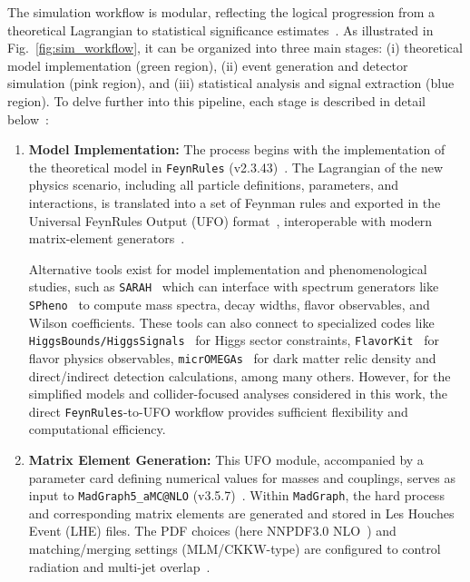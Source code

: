 The simulation workflow is modular, reflecting the logical progression from a theoretical Lagrangian to statistical significance estimates~\cite{Christensen:2008py,Alloul:2013bka,Degrande:2011ua,Alwall:2014hca}. As illustrated in Fig.~\ref{fig:sim_workflow}, it can be organized into three main stages: (i) theoretical model implementation (green region), (ii) event generation and detector simulation (pink region), and (iii) statistical analysis and signal extraction (blue region). To delve further into this pipeline, each stage is described in detail below~\cite{Alwall:2014hca,deFavereau:2013fsa}:

\begin{enumerate}
    \item \textbf{Model Implementation:} The process begins with the implementation of the theoretical model in \texttt{FeynRules} (v2.3.43)~\parencite{Christensen:2008py,Alloul:2013bka}. The Lagrangian of the new physics scenario, including all particle definitions, parameters, and interactions, is translated into a set of Feynman rules and exported in the Universal FeynRules Output (UFO) format~\cite{Degrande:2011ua}, interoperable with modern matrix-element generators~\cite{Alwall:2014hca}. 
    
    Alternative tools exist for model implementation and phenomenological studies, such as \texttt{SARAH}~\cite{Staub:2013tta} which can interface with spectrum generators like \texttt{SPheno}~\cite{Porod:2003um} to compute mass spectra, decay widths, flavor observables, and Wilson coefficients. These tools can also connect to specialized codes like \texttt{HiggsBounds/HiggsSignals}~\cite{Bechtle:2020pkv} for Higgs sector constraints, \texttt{FlavorKit}~\cite{Porod:2014xia} for flavor physics observables, \texttt{micrOMEGAs}~\cite{Belanger:2020gnr} for dark matter relic density and direct/indirect detection calculations, among many others. However, for the simplified models and collider-focused analyses considered in this work, the direct \texttt{FeynRules}-to-UFO workflow provides sufficient flexibility and computational efficiency.
    
    \item \textbf{Matrix Element Generation:} This UFO module, accompanied by a parameter card defining numerical values for masses and couplings, serves as input to \texttt{MadGraph5\_aMC@NLO} (v3.5.7)~\parencite{Alwall:2014bza,Alwall:2014hca}. Within \texttt{MadGraph}, the hard process and corresponding matrix elements are generated and stored in Les Houches Event (LHE) files. The PDF choices (here NNPDF3.0 NLO~\parencite{NNPDF:2014otw}) and matching/merging settings (MLM/CKKW-type) are configured to control radiation and multi-jet overlap~\cite{Alwall:2007fs,Buckley:2015}.
    

\end{enumerate}
